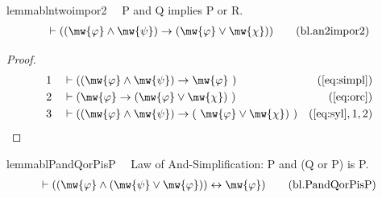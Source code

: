 \begin{restatable}{lemma}{blntwoimpor2}~~ P and Q implies P or R.
\begin{align}
\vdash ( ( \mw{\varphi} \wedge \mw{\psi} ) \rightarrow ( \mw{\varphi} \vee
    \mw{\chi} ) )\label{eq:bl.an2impor2}\tag{bl.an2impor2}
\end{align}
\end{restatable}

\begin{proof}
\begin{align}
  1 &&  & \vdash ( ( \mw{\varphi} \wedge \mw{\psi} ) \rightarrow \mw{\varphi}
     ~)&(\mbox{\ref{eq:simpl}})\notag
  \\ 2 &&  & \vdash ( \mw{\varphi} \rightarrow ( \mw{\varphi} \vee \mw{\chi} )
     ~)&(\mbox{\ref{eq:orc}})\notag
  \\ 3 &&  & \vdash ( ( \mw{\varphi} \wedge \mw{\psi} ) \rightarrow (
     ~\mw{\varphi} \vee \mw{\chi} )
     ~)&(\mbox{\ref{eq:syl}},1,2)\notag
\end{align}
\end{proof}

\begin{restatable}{lemma}{blPandQorPisP}~~ Law of And-Simplification: P and (Q
or P) is P.
\begin{align}
\vdash ( ( \mw{\varphi} \wedge ( \mw{\psi} \vee \mw{\varphi} ) )
    \leftrightarrow \mw{\varphi} )\label{eq:bl.PandQorPisP}\tag{bl.PandQorPisP}
\end{align}
\end{restatable}


